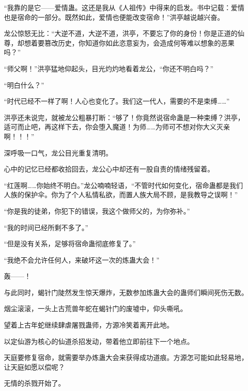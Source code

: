 \begin{this_body}
“我靠的是它——爱情蛊。这还是我从《人祖传》中得来的启发。书中记载：爱情也是宿命的一部分。既然如此，爱情也便能改变宿命！”洪亭越说越兴奋。

龙公惊怒无比：“大逆不道，大逆不道，洪亭，不要忘了你的身份！你是正道的仙尊，却想着要篡改历史，你知道你如此恣意妄为，会造成何等难以想象的恶果吗？”

“师父啊！”洪亭猛地仰起头，目光灼灼地看着龙公，“你还不明白吗？”

“明白什么？”

“时代已经不一样了啊！人心也变化了。我们这一代人，需要的不是束缚……”

洪亭还未说完，就被龙公粗暴打断：“够了！你竟然说宿命蛊是一种束缚？洪亭，适可而止吧，再这样下去，你会堕入魔道！为师……为师可不想对你大义灭亲啊！！！”

深呼吸一口气，龙公目光重复清明。

心中的记忆已经都收拾回去，龙公心中却还有一股自责的情绪残留着。

“红莲啊……你始终不明白。”龙公喃喃轻语，“不管时代如何变化，宿命蛊都是我们人族的保护伞。你为了个人私情私欲，而置人族大局不顾，是我教导之误啊！”

“你是我的徒弟，你犯下的错误，我这个做师父的，为你弥补。”

“我的时间已经所剩不多了。”

“但是没有关系，足够将宿命蛊彻底修复了。”

“我绝不会允许任何人，来破坏这一次的炼蛊大会！”

轰——！

与此同时，蝎针门陡然发生惊天爆炸，无数参加炼蛊大会的蛊师们瞬间死伤无数。

烟尘滚滚，一头上古荒兽年蛇在蝎针门的废墟中，仰头嘶吼。

望着上古年蛇继续肆虐屠戮蛊师，方源冷笑着离开此地。

以定仙游为核心的仙道杀招发动，带着他立即前往下一个地点。

天庭要修复宿命，就需要举办炼蛊大会来获得成功道痕。方源怎可能如此轻易地，让天庭如愿以偿呢？

无情的杀戮开始了。

\end{this_body}

